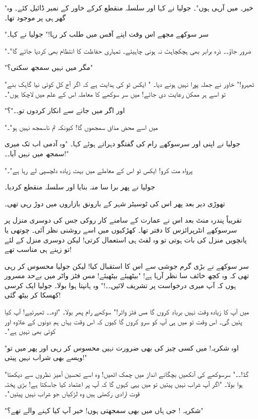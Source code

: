 "خیر۔ میں آرہی ہوں"۔ جولیا نے کہا اور سلسلہ منقطع کرکے خاور کے نمبر ڈائیل کئے۔ وہ گھر ہی پر موجود تھا۔

"سر سوکھے مجھے اس وقت اپنے آفس میں طلب کر رہا!" جولیا نے کہا۔

"ضرور جاؤ۔۔ ذرہ برابر بھی ہچکچاہٹ نہ ہونی چاہیئے۔ تمہاری حفاظت کا انتظام بھی کردیا جائے گا"۔

"مگر میں نہیں سمجھ سکتی؟"

"ٹھہرو!" خاور نے جملہ پورا نہیں ہونے دیا۔ " ایکس ٹو کی ہدایت ہے کہ اگر آج کل کوئی نیا گاہک بنے تو اسے ہر ممکن رعایت دی جائے! میں سر سوکھے کا معاملہ اس کے علم میں لاچکا ہوں"۔

"اور اگر میں جانے سے انکار کردوں تو۔۔"؟

"میں اسے محض مذاق سمجھوں گا! کیونکہ تم ناسمجھ نہیں ہو"۔

جولیا نے اپنی اور سرسوکھے رام کی گفتگو دہراتے ہوئے کہا۔ "وہ آدمی اب تک میری سمجھ میں نہیں آیا۔۔!"

"پرواہ مت کرو! ایکس ٹو اس کے معاملے میں بہت زیادہ دلچسپی لے رہا ہے"۔

جولیا نے پھر برا سا منہ بنایا اور سلسلہ منقطع کردیا۔

تھوڑی دیر بعد پھر اس کی ٹوسیٹر شہر کے بارونق بازاروں میں دوڑ رہی تھی۔

تقریباً پندرہ منٹ بعد اس نے عمارت کے سامنے کار روکی جس کی دوسری منزل پر سرسوکھے انٹرپرائزس کا دفتر تھا۔ کھڑکیوں میں اسے روشنی نظر آئی۔ چوتھی یا پانچویں منزل کی بات ہوتی تو وہ لفٹ ہی استعمال کرتی! لیکن دوسری منزل کے لئے تو زینے ہی مناسب تھے!

سر سوکھے نے بڑی گرم جوشی سے اس کا استقبال کیا! لیکن جولیا محسوس کر رہی تھی کہ وہ کچھ خائف سا نظر آرہا ہے!
"بیٹھیئے بیٹھیئے! مس فٹز واٹر میں بےحد مسرور ہوں کہ آپ میری درخواست پر تشریف لائیں۔۔!" وہ ہانپتا ہوا بولا۔ جولیا ایک کرسی کھسکا کر بیٹھ گئی!

میں آپ کا زیادہ وقت نہیں برباد کروں گا مس فٹز واٹر!" سوکھے رام پھر بولا۔ "اوہ۔۔ ٹھہرئیے! آپ کیا پئیں گی۔ اس وقت تو میں ہی آپ کو سرو کروں گا کیوں کہ اس وقت یہاں ہم دونوں کے علاوہ اور کوئی بھی نہیں ہے"۔

"اوہ شکریہ! میں کسی چیز کی بھی ضرورت نہیں محسوس کر رہی اور پھر میں تو ویسے بھی شراب نہیں پیتی!"

"گڈ!۔۔" سرسوکھے کی آنکھیں بچگانے انداز میں چمک اٹھیں! وہ اسے تحسین آمیز نظروں سے دیکھتا ہوا بولا۔ "اگر آپ شراب نہیں پیتیں تو میں یہی کہوں گا کہ آپ پر اعتماد کیا جاسکتا ہے! بڑی پختہ قوت ارادی رکھتی ہیں وہ لڑکیاں جو شراب نہیں پیتیں"۔

"شکریہ ! جی ہاں میں بھی سمجھتی ہوں! خیر آپ کیا کہنے والے تھے؟"

